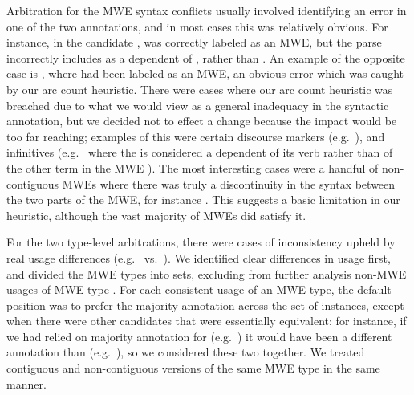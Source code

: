 \documentclass[output=paper
,modfonts
,nonflat]{langsci/langscibook}
\begin{document}
Arbitration for the MWE syntax conflicts usually involved identifying an error in one of the two annotations, and in most cases this was relatively obvious. For instance, in the candidate ,  was correctly labeled as an MWE, but the parse incorrectly includes  as a dependent of , rather than . An example of the opposite case is , where   had been labeled as an MWE, an obvious error which was caught by our arc count heuristic. There were cases where our arc count heuristic was breached due to what we would view as a general inadequacy in the syntactic annotation, but we decided not to effect a change because the impact would be too far reaching; examples of this were certain discourse markers (e.g.\ ), and infinitives (e.g.\  where the  is considered a dependent of its verb rather than of the other term in the MWE ). The most interesting cases were a handful of non-contiguous MWEs where there was truly a discontinuity in the syntax between the two parts of the MWE, for instance . This suggests a basic limitation in our heuristic, although the vast majority of MWEs did satisfy it.

For the two type-level arbitrations, there were cases of inconsistency upheld by real usage differences (e.g.\  vs.\ ). We identified clear differences in usage first, and divided the MWE types into sets, excluding from further analysis non-MWE usages of MWE type \ngram[s]. For each consistent usage of an MWE type, the default position was to prefer the majority annotation across the set of instances, except when there were other candidates that were essentially equivalent: for instance, if we had relied on majority annotation for  (e.g.\ ) it would have been a different annotation than  (e.g.\ ), so we considered these two together. We treated contiguous and non-contiguous versions of the same MWE type in the same manner.
\end{document}
